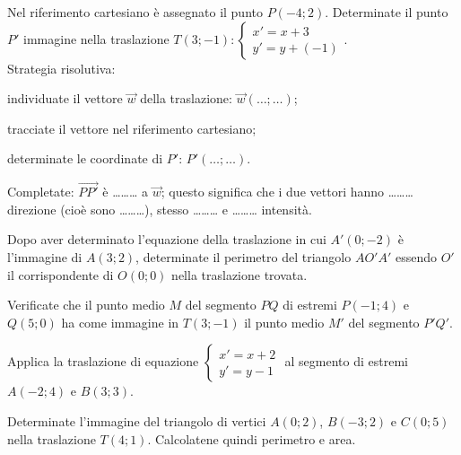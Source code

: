 \begin{esercizio}
  \label{ese:8.48} %
  Nel riferimento cartesiano è assegnato il punto \(P(-4;2)\). 
  Determinate il punto \(P'\) immagine nella traslazione 
  \(T(3;-1):\begin{cases}x'=x+3\\y'=y+(-1)\end{cases}\).\\
  Strategia risolutiva:
  \begin{enumerate*}
    \item individuate il vettore \(\vec{w}\) della traslazione: 
    \(\vec{w}(\ldots{};\ldots{})\);
    \item tracciate il vettore nel riferimento cartesiano;
    \item determinate le coordinate di \(P'\): \(P'(\ldots{};\ldots{})\).
  \end{enumerate*}
  Completate: \(\overrightarrow{PP'}\) è \ldots\ldots\ldots{} a 
  \(\vec{w}\); questo significa che i due vettori hanno 
  \ldots\ldots\ldots{} direzione (cioè sono \ldots\ldots\ldots{}), 
  stesso \ldots\ldots\ldots{} e \ldots\ldots\ldots{} intensità.
\end{esercizio}


\begin{esercizio}
  \label{ese:8.51} %
  Dopo aver determinato l'equazione della traslazione in cui \(A'(0;-2)\) 
  è l'immagine di \(A(3;2)\), determinate il perimetro del triangolo 
  \(AO'A'\) essendo \(O'\) il corrispondente di \(O(0;0)\) nella traslazione 
  trovata.
\end{esercizio}

\begin{esercizio}
  \label{ese:8.52} %
  Verificate che il punto medio \(M\) del segmento \(PQ\) di estremi 
  \(P(-1;4)\) e \(Q(5;0)\) ha come immagine in \(T(3;-1)\) il punto medio 
  \(M'\) del segmento \(P'Q'\).
\end{esercizio}

\begin{esercizio}
  \label{ese:8.53} %
  Applica la traslazione di equazione 
  \(\begin{cases}x'=x+2\\y'=y-1\end{cases}\) al segmento di estremi 
  \(A(-2;4)\) e \(B(3;3)\). 
\end{esercizio}

\begin{esercizio}
  \label{ese:8.55} %
  Determinate l'immagine del triangolo di vertici \(A(0;2)\), \(B(-3;2)\) e 
  \(C(0;5)\) nella traslazione \(T(4;1)\). Calcolatene quindi perimetro e 
  area.
\end{esercizio}

